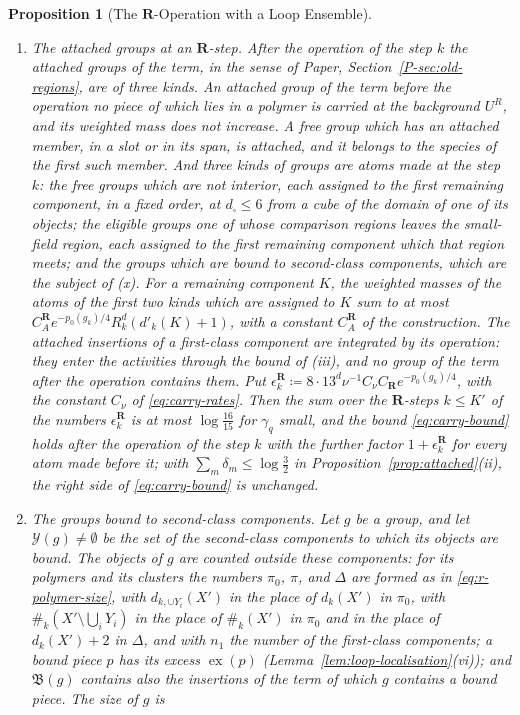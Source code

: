 \documentclass[11pt]{preprint}
\numberwithin{equation}{section}
\newtheorem{proposition}{Proposition}
\theoremstyle{definition}
\theoremstyle{remark}
\theoremstyle{plain}
\begin{document}
\begin{proposition}[The $\mathbf R$-Operation with a Loop Ensemble]
\begin{enumerate}[label=(\roman*)]
\item \emph{The attached groups at an $\mathbf R$-step.} After the operation of the step $k$ the attached groups of the term, in the sense of Paper, Section~\ref{P-sec:old-regions}, are of three kinds. An attached group of the term before the operation no piece of which lies in a polymer is carried at the background $U^R$, and its weighted mass does not increase. A free group which has an attached member, in a slot or in its span, is attached, and it belongs to the species of the first such member. And three kinds of groups are atoms made at the step $k$: the free groups which are not interior, each assigned to the first remaining component, in a fixed order, at $d_\square \leq 6$ from a cube of the domain of one of its objects; the eligible groups one of whose comparison regions leaves the small-field region, each assigned to the first remaining component which that region meets; and the groups which are bound to second-class components, which are the subject of (x). For a remaining component $K$, the weighted masses of the atoms of the first two kinds which are assigned to $K$ sum to at most $C^{\mathbf R}_Ae^{-p_0(g_k)/4}R_k^d(d'_k(K) + 1)$, with a constant $C^{\mathbf R}_A$ of the construction. The attached insertions of a first-class component are integrated by its operation: they enter the activities through the bound of (iii), and no group of the term after the operation contains them. Put $\epsilon^{\mathbf R}_k \coloneqq 8 \cdot 13^d\nu^{-1}C_\nu C_{\mathbf R}e^{-p_0(g_k)/4}$, with the constant $C_\nu$ of \eqref{eq:carry-rates}. Then the sum over the $\mathbf R$-steps $k \leq K'$ of the numbers $\epsilon^{\mathbf R}_k$ is at most $\log\frac{16}{15}$ for $\gamma_q$ small, and the bound \eqref{eq:carry-bound} holds after the operation of the step $k$ with the further factor $1 + \epsilon^{\mathbf R}_k$ for every atom made before it; with $\sum_m\delta_m \leq \log\frac32$ in Proposition~\ref{prop:attached}(ii), the right side of \eqref{eq:carry-bound} is unchanged.
\item \emph{The groups bound to second-class components.} Let $g$ be a group, and let $\mathcal Y(g) \neq \emptyset$ be the set of the second-class components to which its objects are bound. The objects of $g$ are counted outside these components: for its polymers and its clusters the numbers $\pi_0$, $\pi$, and $\Delta$ are formed as in \eqref{eq:r-polymer-size}, with $d_{k,\cup Y_i}(X')$ in the place of $d_k(X')$ in $\pi_0$, with $\#_k(X' \setminus \bigcup_iY_i)$ in the place of $\#_k(X')$ in $\pi_0$ and in the place of $d_k(X') + 2$ in $\Delta$, and with $n_1$ the number of the first-class components; a bound piece $p$ has its excess $\operatorname{ex}(p)$ (Lemma~\ref{lem:loop-localisation}(vi)); and $\mathfrak B(g)$ contains also the insertions of the term of which $g$ contains a bound piece. The size of $g$ is

\end{enumerate}
\end{proposition}
\end{document}
